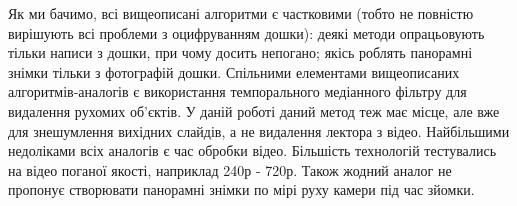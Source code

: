 \chapterConclusion

Як ми бачимо, всі вищеописані алгоритми є частковими (тобто не повністю вирішують всі проблеми
з оцифруванням дошки): деякі методи опрацьовують тільки написи з дошки, 
при чому досить непогано; якісь роблять панорамні знімки тільки з фотографій дошки.
Спільними елементами вищеописаних алгоритмів-аналогів є використання 
темпорального медіанного фільтру для видалення рухомих об'єктів.
У даній роботі даний метод теж має місце, але вже для знешумлення
вихідних слайдів, а не видалення лектора з відео.
Найбільшими недоліками всіх аналогів є час обробки відео. Більшість технологій
тестувались на відео поганої якості, наприклад 240р - 720р. 
Також жодний аналог не пропонує створювати панорамні знімки по мірі руху камери під
час зйомки.